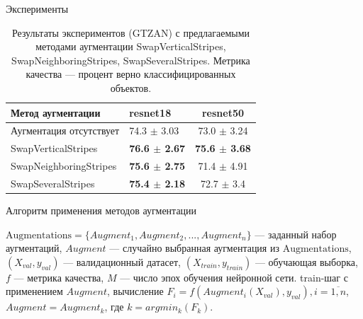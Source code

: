 \documentclass[12pt, fleqn]{beamer}
\begin{document}
\begin{frame}{Эксперименты}
    \begin{table}[ht!]
    \centering
	\begin{tabular}{| l | l | c |}
    	\hline
	    Метод аугментации & resnet18 & resnet50 \\ \hline
	    Аугментация отсутствует  & 74.3 $\pm$ 3.03 & 73.0 $\pm$ 3.24 \\ \hline
	    SwapVerticalStripes & \textbf{76.6 $\pm$ 2.67} & \textbf{75.6 $\pm$ 3.68} \\ \hline
	    SwapNeighboringStripes & \textbf{75.6 $\pm$ 2.75} & 71.4 $\pm$ 4.91 \\ \hline
	    SwapSeveralStripes & \textbf{75.4 $\pm$ 2.18} & 72.7 $\pm$ 3.4 \\ \hline
	\end{tabular}
	\caption{Результаты экспериментов (GTZAN) с предлагаемыми методами аугментации SwapVerticalStripes, SwapNeighboringStripes, SwapSeveralStripes. Метрика качества --- процент верно классифицированных объектов.}
	\label{table:lukianov_pavel_t2}
\end{table}
\end{frame}

\begin{frame}{Алгоритм применения методов аугментации}

\algrenewcommand{}
\algrenewcommand{}

\begin{algorithm}[H]
    \caption{Предлагаемый алгоритм}\label{alg:Alg1}
    \begin{algorithmic}
    \State $\text{Augmentations} = \{Augment_1, Augment_2, ..., Augment_n\}$ --- заданный набор аугментаций,
    \State $Augment$ --- случайно выбранная аугментация  из $\text{Augmentations}$,
    \State $(X_{val}, y_{val})$ --- валидационный датасет, 
    \State $(X_{train}, y_{train})$ --- обучающая выборка,
    \State $f$ --- метрика качества,
    \State $M$ --- число эпох обучения нейронной сети.
    \State train-шаг с применением $Augment$,
    \State вычисление $F_i = f(Augment_i(X_{val}), y_{val}), i = \overline{1,n}$,
    \State $Augment = Augment_k$, где $k = argmin_k(F_k)$.
    \EndFor
    \end{algorithmic}
\end{algorithm}
\end{frame}
\end{document}
